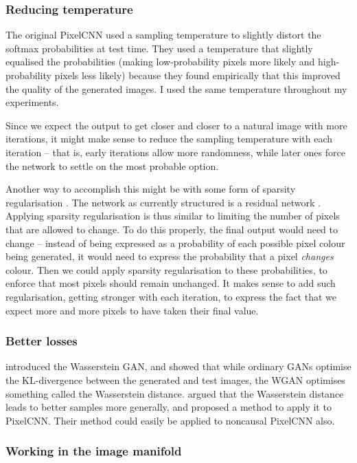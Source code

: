 \documentclass[11pt, a4paper, openany]{book}
\begin{document}
\subsubsection{Reducing temperature} \label{temperature}

The original PixelCNN used a sampling temperature \citep{pixelcnn2} to slightly distort the softmax probabilities at test time. They used a temperature that slightly equalised the probabilities (making low-probability pixels more likely and high-probability pixels less likely) because they found empirically that this improved the quality of the generated images. I used the same temperature throughout my experiments.

Since we expect the output to get closer and closer to a natural image with more iterations, it might make sense to reduce the sampling temperature with each iteration -- that is, early iterations allow more randomness, while later ones force the network to settle on the most probable option.

Another way to accomplish this might be with some form of sparsity regularisation \citep{sparse1,sparse2}. The network as currently structured is a residual network \citep{resnet}. Applying sparsity regularisation is thus similar to limiting the number of pixels that are allowed to change. To do this properly, the final output would need to change -- instead of being expressed as a probability of each possible pixel colour being generated, it would need to express the probability that a pixel \emph{changes} colour. Then we could apply sparsity regularisation to these probabilities, to enforce that most pixels should remain unchanged. It makes sense to add such regularisation, getting stronger with each iteration, to express the fact that we expect more and more pixels to have taken their final value.

\subsubsection{Better losses}

\citet{wgan} introduced the Wasserstein GAN, and showed that while ordinary GANs optimise the KL-divergence between the generated and test images, the WGAN optimises something called the Wasserstein distance. \citet{quantiles} argued that the Wasserstein distance leads to better samples more generally, and proposed a method to apply it to PixelCNN. Their method could easily be applied to noncausal PixelCNN also.

\subsubsection{Working in the image manifold}
\end{document}
